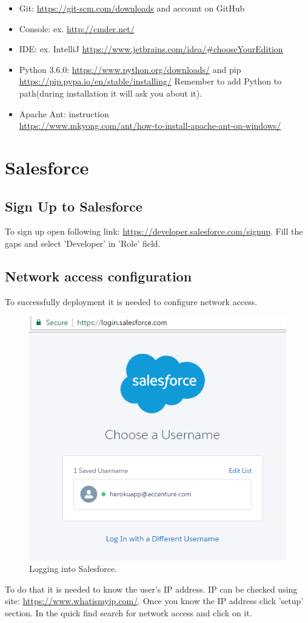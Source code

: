 \documentclass[12pt,a4paper]{article}
\begin{document}
\begin{itemize}
\item Git: \url{https://git-scm.com/downloads} and account on GitHub
\item Console: ex. \url{http://cmder.net/}
\item IDE: ex. IntelliJ \url{https://www.jetbrains.com/idea/#chooseYourEdition}
\item Python 3.6.0: \url{https://www.python.org/downloads/} and pip \url{https://pip.pypa.io/en/stable/installing/} Remember to add Python to path(during installation it will ask you about it).
\item Apache Ant: instruction\\ \url{https://www.mkyong.com/ant/how-to-install-apache-ant-on-windows/} 



\end{itemize}

\section{Salesforce}
\subsection{Sign Up to Salesforce}
To sign up open following link: \url{https://developer.salesforce.com/signup}.
Fill the gaps and select 'Developer' in 'Role' field.
\subsection{Network access configuration}
To successfully deployment it is needed to configure network access.
\begin{figure}[H]
	\centering
	\includegraphics{images/connect5.PNG}
	\caption{Logging into Salesforce.}
	\label{fig:log}
\end{figure}
To do that it is needed to know the user’s IP address. IP can be checked using site: \url{https://www.whatismyip.com/}.
Once you know the IP address click 'setup' section. In the quick find search for network access and click on it.  
\end{document}
